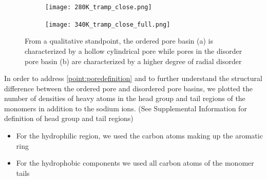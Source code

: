 \documentclass{article}
\begin{document}
  \begin{figure}[!ht]
        \centering
        \begin{subfigure}[b]{0.475\textwidth}
                \centering
                \texttt{[image: 280K\_tramp\_close.png]}
                \caption{}\label{fig:OPbasin}
        \end{subfigure}
        \begin{subfigure}[b]{0.475\textwidth}
                \centering
                \texttt{[image: 340K\_tramp\_close\_full.png]}
                \caption{}\label{fig:DPbasin}
        \end{subfigure}
        \caption{From a qualitative standpoint, the ordered pore basin (a) is characterized by a
        hollow cylindrical pore while pores in the disorder pore basin (b) are characterized by a
        higher degree of radial disorder}\label{fig:basins}
  \end{figure}


  In order to address \ref{point:poredefinition} and to further understand the structural difference 
  between the ordered pore and disordered pore basins, we plotted the number of densities of
  heavy atoms in the head group and tail regions of the monomers in addition to the sodium ions.
  (See Supplemental Information for definition of head group and tail regions) 
  \begin{itemize}
	\item For the hydrophilic region, we used the carbon atoms making up the aromatic ring
	\item For the hydrophobic components we used all carbon atoms of the monomer tails
  \end{itemize} 
\end{document}
